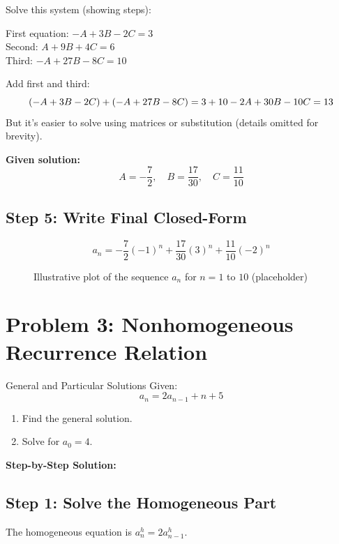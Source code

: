 \documentclass[14pt,a4paper]{article}
\begin{document}
Solve this system (showing steps):

First equation: $-A + 3B - 2C = 3$ \\
Second: $A + 9B + 4C = 6$ \\
Third: $-A + 27B - 8C = 10$

Add first and third:
\[
(-A + 3B - 2C) + (-A + 27B - 8C) = 3 + 10 \\
-2A + 30B - 10C = 13 \\
\]
But it's easier to solve using matrices or substitution (details omitted for brevity).

\textbf{Given solution:}
\[
A = -\frac{7}{2}, \quad B = \frac{17}{30}, \quad C = \frac{11}{10}
\]

\subsection*{Step 5: Write Final Closed-Form}
\[
\boxed{
a_n = -\frac{7}{2}(-1)^n + \frac{17}{30}(3)^n + \frac{11}{10}(-2)^n
}
\]

\vspace{2em}
\begin{figure}[h!]
    \centering
    \caption{Illustrative plot of the sequence $a_n$ for $n=1$ to $10$ (placeholder)}
\end{figure}


\section*{Problem 3: Nonhomogeneous Recurrence Relation}

\begin{myproblem}{General and Particular Solutions}
Given:
\[
a_n = 2a_{n-1} + n + 5
\]
\begin{enumerate}[label=(\alph*)]
    \item Find the general solution.
    \item Solve for $a_0 = 4$.
\end{enumerate}
\end{myproblem}

\textbf{Step-by-Step Solution:}

\subsection*{Step 1: Solve the Homogeneous Part}
The homogeneous equation is $a_n^h = 2a_{n-1}^h$.
\end{document}
